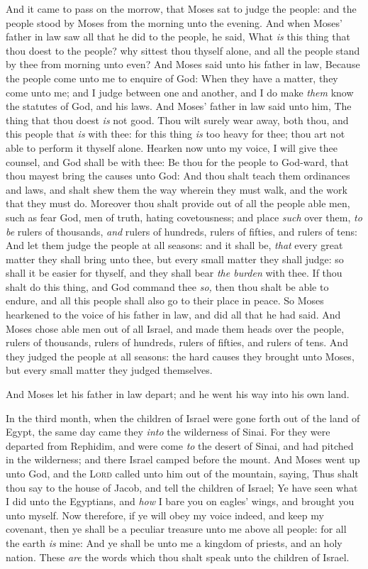 \documentclass[11pt,letterpaper,oneside]{memoir}
\begin{document}
And it came to pass on the morrow, that Moses sat to judge the people:
and the people stood by Moses from the morning unto the evening. And
when Moses' father in law saw all that he did to the people, he said,
What \emph{is} this thing that thou doest to the people? why sittest
thou thyself alone, and all the people stand by thee from morning unto
even? And Moses said unto his father in law, Because the people come
unto me to enquire of God: When they have a matter, they come unto me;
and I judge between one and another, and I do make \emph{them} know the
statutes of God, and his laws. And Moses' father in law said unto him,
The thing that thou doest \emph{is} not good. Thou wilt surely wear
away, both thou, and this people that \emph{is} with thee: for this
thing \emph{is} too heavy for thee; thou art not able to perform it
thyself alone. Hearken now unto my voice, I will give thee counsel, and
God shall be with thee: Be thou for the people to God-ward, that thou
mayest bring the causes unto God: And thou shalt teach them ordinances
and laws, and shalt shew them the way wherein they must walk, and the
work that they must do. Moreover thou shalt provide out of all the
people able men, such as fear God, men of truth, hating covetousness;
and place \emph{such} over them, \emph{to be} rulers of thousands,
\emph{and} rulers of hundreds, rulers of fifties, and rulers of tens:
And let them judge the people at all seasons: and it shall be,
\emph{that} every great matter they shall bring unto thee, but every
small matter they shall judge: so shall it be easier for thyself, and
they shall bear \emph{the burden} with thee. If thou shalt do this thing, and
God command thee \emph{so,} then thou shalt be able to endure, and all
this people shall also go to their place in peace. So Moses hearkened to
the voice of his father in law, and did all that he had said. And Moses
chose able men out of all Israel, and made them heads over the people,
rulers of thousands, rulers of hundreds, rulers of fifties, and rulers
of tens. And they judged the people at all seasons: the hard causes they
brought unto Moses, but every small matter they judged themselves.

And Moses let his father in law depart; and he went his way into his own
land.

In the third month, when the children of Israel were gone forth out of
the land of Egypt, the same day came they \emph{into} the wilderness of
Sinai. For they were departed from Rephidim, and were come \emph{to} the
desert of Sinai, and had pitched in the wilderness; and there Israel
camped before the mount. And Moses went up unto God, and the
\textsc{Lord} called unto him out of the mountain, saying, Thus shalt
thou say to the house of Jacob, and tell the children of Israel; Ye have
seen what I did unto the Egyptians, and \emph{how} I bare you on eagles'
wings, and brought you unto myself. Now therefore, if ye will obey my
voice indeed, and keep my covenant, then ye shall be a peculiar treasure
unto me above all people: for all the earth \emph{is} mine: And ye shall
be unto me a kingdom of priests, and an holy nation. These \emph{are}
the words which thou shalt speak unto the children of Israel.
\end{document}
